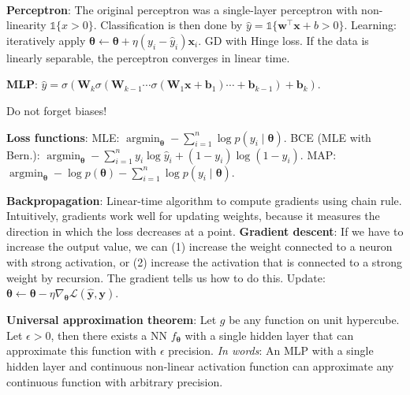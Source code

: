 \documentclass{article}
\DeclareMathOperator*{\argmin}{argmin}
\newcommand{\lft}{\mathopen{}\mathclose\bgroup\left}
\newcommand{\rgt}{\aftergroup\egroup\right}
\renewcommand{\vec}[1]{\bm{#1}}
\newcommand{\mat}[1]{\bm{#1}}
\newenvironment{topic}[1]
{\textbf{\sffamily \colorbox{black}{\rlap{\textbf{\textcolor{white}{#1}}}\hspace{\linewidth}\hspace{-2\fboxsep}}} \\ \vspace{0.2cm}}
{}
\begin{document}
\begin{multicols*}{2}
\begin{itemize}
    \end{itemize}


    \begin{topic}{Neural networks}

        \textbf{Perceptron}: The original perceptron was a single-layer perceptron with non-linearity
        $\mathds{1}\{ x > 0 \}$. Classification is then done by $\hat{y} = \mathds{1}\{ \vec{w}^\top
            \vec{x} + b > 0 \}$. Learning: iteratively apply $\vec{\theta} \gets
            \vec{\theta} + \eta(y_i - \hat{y}_i) \vec{x}_i$. GD with Hinge loss.
        If the data is linearly separable, the perceptron converges in linear time.

        \textbf{MLP}: $\hat{y} = \sigma (\mat{W}_k \sigma( \mat{W}_{k-1} \cdots \sigma( \mat{W}_1 \vec{x} + \vec{b}_1 ) \cdots + \vec{b}_{k-1} ) + \vec{b}_k )$.

        Do not forget biases!

        \textbf{Loss functions}: MLE: $\argmin_{\vec{\theta}} - \sum_{i=1}^{n} \log p(y_i \mid \vec{\theta})$.
        BCE (MLE with Bern.): $\argmin_{\vec{\theta}} - \sum_{i=1}^{n} y_i \log \hat{y}_i + (1-y_i) \log (1 - \hat{y}_i)$.
        MAP: $\argmin_{\vec{\theta}} - \log p(\vec{\theta}) - \sum_{i=1}^{n} \log p(y_i \mid \vec{\theta})$.

        \textbf{Backpropagation}: Linear-time algorithm to compute gradients using chain rule.
        Intuitively, gradients work well for updating weights, because it measures the direction in
        which the loss decreases at a point. \textbf{Gradient descent}: If we have to increase the
        output value, we can (1) increase the weight connected to a neuron with strong activation, or
        (2) increase the activation that is connected to a strong weight by recursion. The gradient
        tells us how to do this. Update: $\vec{\theta} \gets \vec{\theta} - \eta \nabla_{\vec{\theta}} \mathcal{L}(\hat{\vec{y}}, \vec{y})$.

        \textbf{Universal approximation theorem}: Let $g$ be any function on unit hypercube. Let
        $\epsilon > 0$, then there exists a NN $f_{\vec{\theta}}$ with a single hidden layer that can
        approximate this function with $\epsilon$ precision. \textit{In words}: An MLP with a single
        hidden layer and continuous non-linear activation function can approximate any continuous
        function with arbitrary precision.


\end{topic}
\end{multicols*}
\end{document}
